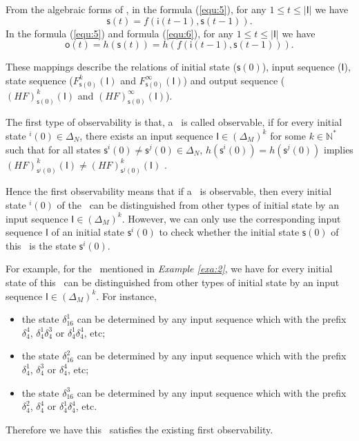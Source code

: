   
  
  From the algebraic forms of \BCNs, in the formula (\ref{equ:5}), for any $1\le t \le |\mathsf{I}|$ we have 
 \[\mathsf{s}(t)=f(\mathsf{i}(t-1),\mathsf{s}(t-1)).\] 
 In the formula (\ref{equ:5}) and formula (\ref{equ:6}), for any $1\le t \le |\mathsf{I}|$ we have  
 \[\mathsf{o}(t)=h(\mathsf{s}(t))=h(f(\mathsf{i}(t-1),\mathsf{s}(t-1))).\] 

These mappings describe the relations of initial state ($\mathsf{s}(0)$), input sequence ($\mathsf{I}$), state sequence ($F^k_{\mathsf{s}(0)}(\mathsf{I})$ and $F^{\infty}_{\mathsf{s}(0)}(\mathsf{I})$) and output sequence ($(HF)^k_{\mathsf{s}(0)}(\mathsf{I})$ and $(HF)^{\infty}_{\mathsf{s}(0)}(\mathsf{I})$). 

\begin{definition} 
The first type of observability is that, a \BCN\ is called observable, if for every initial state \State$^{i}(0)$$\in \Delta_N$, there exists an input sequence $\mathsf{I}\in(\Delta_M)^k$ for some $k\in \mathbb{N}^*$ such that for all states $\mathsf{s}^{i}(0)\neq \mathsf{s}^{j}(0)\in \Delta_N$, $h(\mathsf{s}^{i}(0))=h(\mathsf{s}^{j}(0))$ implies $(HF)^k_{\mathsf{s}^{i}(0)}(\mathsf{I})\neq (HF)^k_{{\mathsf{s}^{j}(0)}}(\mathsf{I})$ \cite{cheng2009controllability}.
\end{definition}

Hence the first observability means that if a \BCN\ is observable, then every initial state \State$^{i}(0)$ of the \BCN\ can be distinguished from other types of initial state by an input sequence $\mathsf{I}\in(\Delta_M)^k$. However, we can only use the corresponding input sequence $\mathsf{I}$ of an initial state $\mathsf{s}^{i}(0)$ to check whether the initial state $\mathsf{s}(0)$ of this \BCN\ is the state $\mathsf{s}^{i}(0)$.
\begin{example}
For example, for the \BCN\ mentioned in {\em Example \ref{exa:2}}, we have for every initial state of this \BCN\ can be distinguished from other types of initial state by an input sequence $\mathsf{I}\in(\Delta_M)^k$.  For instance,
\begin{itemize}
  \item the state $\delta_{16}^1$ can be determined by any input sequence which with the prefix $\delta_{4}^4$, $\delta_{4}^1  \delta_{4}^3$ or $\delta_{4}^1 \delta_{4}^4$, etc;
  \item the state $\delta_{16}^2$ can be determined by any input sequence which with the prefix $\delta_{4}^1$, $\delta_{4}^3$ or $\delta_{4}^4$, etc;
  \item the state $\delta_{16}^3$ can be determined by any input sequence which with the prefix $\delta_{4}^2$, $\delta_{4}^4$ or $\delta_{4}^1 \delta_{4}^4$, etc.
\end{itemize} 

Therefore we have this \BCN\ satisfies the existing first observability.
\label{exa:4}
\end{example}   

